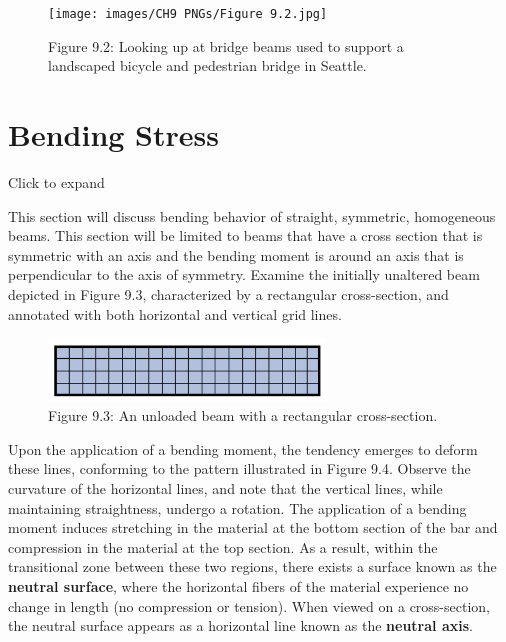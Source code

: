 \documentclass[
  letterpaper,
  DIV=11,
  numbers=noendperiod]{scrreprt}
\begin{document}
\begin{figure}[H]

{\centering \texttt{[image: images/CH9 PNGs/Figure 9.2.jpg]}

}

\caption{Figure 9.2: Looking up at bridge beams used to support a
landscaped bicycle and pedestrian bridge in Seattle.}

\end{figure}%

\section{Bending Stress}\label{bending-stress}

Click to expand

This section will discuss bending behavior of straight, symmetric,
homogeneous beams. This section will be limited to beams that have a
cross section that is symmetric with an axis and the bending moment is
around an axis that is perpendicular to the axis of symmetry. Examine
the initially unaltered beam depicted in Figure 9.3, characterized by a
rectangular cross-section, and annotated with both horizontal and
vertical grid lines.

\begin{figure}[H]

{\centering \includegraphics[width=2.89583in,height=\textheight]{images/CH9 PNGs/Figure 9.3.png}

}

\caption{Figure 9.3: An unloaded beam with a rectangular cross-section.}

\end{figure}%

Upon the application of a bending moment, the tendency emerges to deform
these lines, conforming to the pattern illustrated in Figure 9.4.
Observe the curvature of the horizontal lines, and note that the
vertical lines, while maintaining straightness, undergo a rotation. The
application of a bending moment induces stretching in the material at
the bottom section of the bar and compression in the material at the top
section. As a result, within the transitional zone between these two
regions, there exists a surface known as the \textbf{neutral surface},
where the horizontal fibers of the material experience no change in
length (no compression or tension). When viewed on a cross-section, the
neutral surface appears as a horizontal line known as the
\textbf{neutral axis}.
\end{document}
